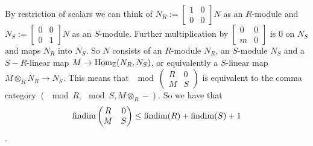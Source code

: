 By restriction of scalars we can think of $N_R:=\begin{bmatrix}
	1 & 0\\
	0 & 0
\end{bmatrix}N$ as an $R$-module and $N_S:=\begin{bmatrix}
0 & 0\\
0 & 1
\end{bmatrix}N$ as an $S$-module. Further multiplication by $\begin{bmatrix}
0 & 0\\
m & 0
\end{bmatrix}$ is 0 on $N_S$ and maps $N_R$ into $N_S$. So $N$ consists of an $R$-module $N_R$, an $S$-module $N_S$ and a $S-R$-linear map $M \to \operatorname{Hom}_\mathbb{Z}(N_R, N_S)$, or equivalently a $S$-linear map $M \otimes_R N_R \to N_S$. This means that $\mod \begin{pmatrix}
R & 0\\
M & S
\end{pmatrix}$ is equivalent to the comma category $(\mod R, \mod S, M \otimes_R -)$. So we have that $$\operatorname{findim}\begin{pmatrix}
R & 0\\
M & S
\end{pmatrix} \leq \operatorname{findim}(R) + \operatorname{findim}(S)+1$$.

